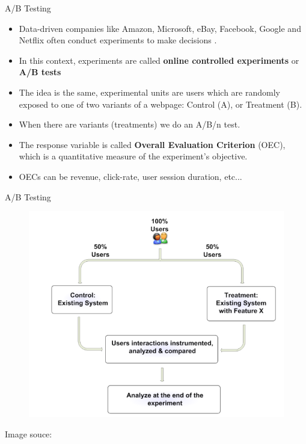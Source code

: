 \documentclass[handout]{beamer}
\begin{document}
\begin{frame}{A/B Testing}
\scriptsize{


\begin{itemize}

\item Data-driven companies like Amazon, Microsoft, eBay, Facebook, Google and Netflix often conduct experiments to make decisions \cite{kohavi2012trustworthy}.

\item In this context, experiments are called \textbf{online  controlled experiments} or \textbf{A/B tests} 
 

 \item The idea is the same, experimental units are users which are randomly exposed to one of two variants of a webpage: Control (A), or Treatment (B).
 
 \item When there are variants (treatments) we do an A/B/n test.
 
 \item The response variable is called \textbf{Overall  Evaluation  Criterion} (OEC), which is  a  quantitative measure of the experiment's objective. 
 
 \item OECs can be revenue, click-rate, user session duration, etc...
 \end{itemize}

} 
\end{frame}


\begin{frame}{A/B Testing}

 \begin{figure}[h!]
	\centering
	\includegraphics[scale=0.34]{pics/abtest.png}
\end{figure}
Image souce: \cite{kohavi2012trustworthy} 
\end{frame}
\end{document}
